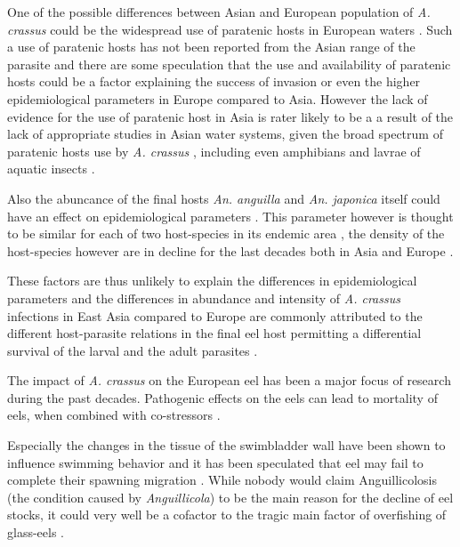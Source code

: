 One of the possible differences between Asian and European population
of \textit{A. crassus} could be the widespread use of paratenic hosts
in European waters \cite{thomas_paratenic_1992,
  pietrock_dynamics_2002}. Such a use of paratenic hosts has not been
reported from the Asian range of the parasite and there are some
speculation that the use and availability of paratenic hosts could be
a factor explaining the success of invasion or even the higher
epidemiological parameters in Europe compared to Asia. However the
lack of evidence for the use of paratenic host in Asia is rater likely
to be a a result of the lack of appropriate studies in Asian water
systems, given the broad spectrum of paratenic hosts use by
\textit{A. crassus}
\cite{pietrock_dynamics_2002,rolbiecki_acndab_2004,szkely_dynamics_1995},
including even amphibians and lavrae of aquatic insects
\cite{moravec_amphibians_1998}.

Also the abuncance of the final hosts \textit{An. anguilla} and
\textit{An. japonica} itself could have an effect on epidemiological
parameters \cite{schabuss_dynamics_2005}. This parameter however is
thought to be similar for each of two host-species in its endemic area
\cite{tesch1983aal}, the density of the host-species however are in
decline for the last decades both in Asia and Europe
\cite{pmid12713741}.

These factors are thus unlikely to explain the differences in
epidemiological parameters and the differences in abundance and
intensity of \textit{A. crassus} infections in East Asia compared to
Europe are commonly attributed to the different host-parasite
relations in the final eel host permitting a differential survival of
the larval and the adult parasites \cite{knopf_differences_2004,
  knopf_swimbladder_2006}.

The impact of \textit{A. crassus} on the European eel has been a major
focus of research during the past decades. Pathogenic effects on the
eels can lead to mortality of eels, when combined with co-stressors
\cite{gollock_physiological_2005}.

Especially the changes in the tissue of the swimbladder wall have been
shown to influence swimming behavior and it has been speculated that
eel may fail to complete their spawning migration
\cite{palstra_swimming_2007}. While nobody would claim Anguillicolosis
(the condition caused by \textit{Anguillicola}) to be the main reason
for the decline of eel stocks, it could very well be a cofactor
\cite{sures_science_letter} to the tragic main factor of overfishing
of glass-eels \cite{pmid12713741}.

